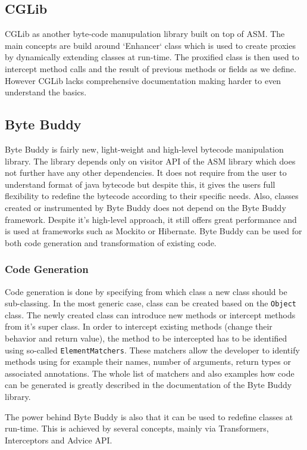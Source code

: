 \subsection{CGLib}
\label{cglib}
CGLib as another byte-code manupulation library built on top of ASM. The main concepts are build around `Enhancer` class which is used to create proxies by dynamically extending classes at run-time. The proxified class is then used to intercept method calls and the result of previous methods or fields as we define. However CGLib lacks comprehensive documentation making harder to even understand the basics.

\subsection{Byte Buddy}
\label{sec:byte_buddy}
Byte Buddy is fairly new, light-weight and high-level bytecode manipulation library. The library depends only on visitor API of the ASM library which does not further have any other dependencies. It does not require from the user to understand format of java bytecode but despite this, it gives the users full flexibility to redefine the bytecode according to their specific needs. Also, classes created or instrumented by Byte Buddy does not depend on the Byte Buddy framework. Despite it's high-level approach, it still offers great performance and is used at frameworks such as Mockito or Hibernate. Byte Buddy can be used for both code generation and transformation of existing code.

\subsubsection{Code Generation}
Code generation is done by specifying from which class a new class should be sub-classing. In the most generic case, class can be created based on the \texttt{Object} class. The newly created class can introduce new methods or intercept methods from it's super class. In order to intercept existing methods (change their behavior and return value), the method to be intercepted has to be identified using so-called \texttt{ElementMatchers}. These matchers allow the developer to identify methods using for example their names, number of arguments, return types or associated annotations. The whole list of matchers and also examples how code can be generated is greatly described in the documentation of the Byte Buddy library.

The power behind Byte Buddy is also that it can be used to redefine classes at run-time. This is achieved by several concepts, mainly via Transformers, Interceptors and Advice API.

